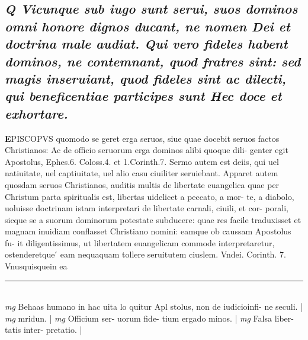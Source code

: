 \documentclass{article}
\begin{document}
\begin{pages}
\subsection*{\textit{Q Vicunque sub iugo sunt serui, suos dominos omni honore dignos ducant, ne nomen Dei et doctrina male audiat. Qui vero fideles habent dominos, ne contemnant, quod fratres sint: sed magis inseruiant, quod fideles sint ac dilecti, qui beneficentiae participes sunt Hec doce et exhortare. }}\pstart \huge\textbf{E}\normalsize PISCOPVS quomodo se geret erga seruos, siue quae docebit seruos factos Christianos: Ac de officio seruorum erga dominos alibi quoque dili- genter egit Apostolus, Ephes.6. Coloss.4. et 1.Corinth.7. Sermo autem est deiis, qui uel natiuitate, uel captiuitate, uel alio casu ciuiliter seruiebant. Apparet autem quosdam seruos Christianos, auditis multis de libertate euangelica quae per Christum parta spiritualis est, libertas uidelicet a peccato, a mor- te, a diabolo, uoluisse doctrinam istam interpretari de libertate carnali, ciuili, et cor- porali, sicque se a suorum dominorum potestate subducere: quae res facile traduxisset et magnam inuidiam conflasset Christiano nomini: eamque ob caussam Apostolus fu- it diligentissimus, ut libertatem euangelicam commode interpretaretur, ostenderetque ́ eam nequaquam tollere seruitutem ciuslem. Vndei. Corinth. 7. Vnusquisquein ea  \pend\pstart \huge\textbf{}\normalsize  \pend
\vspace{0.5cm}\noindent
\vspace{0.2cm}\rule{1cm}{0.2pt}\\ 
\hspace{0.2cm}\textit{mg}
\footnotesize Behaas humano in hac uita lo quitur Apl stolus, non de iudicioinfi- ne seculi. 
\normalsize| 
\hspace{0.2cm}\textit{mg}
\footnotesize mridun. 
\normalsize| 
\hspace{0.2cm}\textit{mg}
\footnotesize Officium ser- uorum fide- tium ergado minos. 
\normalsize| 
\hspace{0.2cm}\textit{mg}
\footnotesize Falsa liber- tatis inter- pretatio. 
\normalsize| 

\end{pages}
\end{document}
